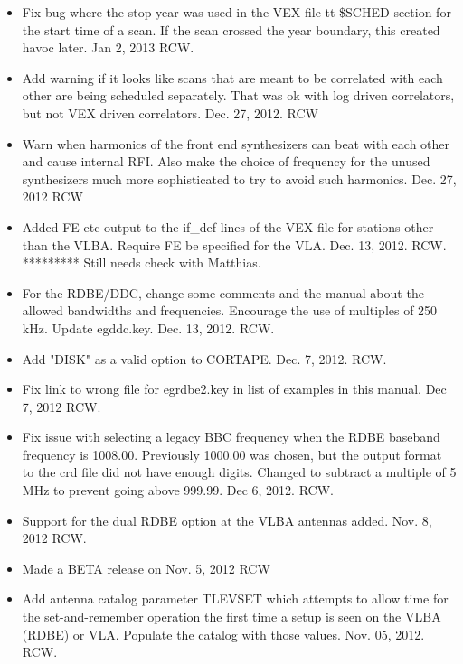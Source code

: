 \documentclass{report}
\begin{document}
\begin{itemize}
\item Fix bug where the stop year was used in the VEX file {tt
\$SCHED} section for the start time of a scan.  If the scan crossed
the year boundary, this created havoc later.  Jan 2, 2013 RCW.

\item Add warning if it looks like scans that are meant to be correlated
with each other are being scheduled separately.  That was ok with log
driven correlators, but not VEX driven correlators.  Dec. 27, 2012. RCW

\item Warn when harmonics of the front end synthesizers can beat with
each other and cause internal RFI.  Also make the choice of frequency
for the unused synthesizers much more sophisticated to try to avoid
such harmonics.  Dec. 27, 2012  RCW

\item Added FE etc output to the if\_def lines of the VEX file for
stations other than the VLBA.  Require FE be specified for the VLA.
Dec. 13, 2012.  RCW.  *********  Still needs check with Matthias.



\item For the RDBE/DDC, change some comments and the manual about the
allowed bandwidths and frequencies.  Encourage the use of multiples
of 250 kHz.  Update egddc.key.  Dec. 13, 2012.  RCW.

\item Add "DISK" as a valid option to CORTAPE.  Dec. 7, 2012.  RCW.

\item Fix link to wrong file for egrdbe2.key in list of examples in
this manual.  Dec 7, 2012  RCW.

\item Fix issue with selecting a legacy BBC frequency when the RDBE
baseband frequency is 1008.00.  Previously 1000.00 was chosen, but
the output format to the crd file did not have enough digits.  Changed
to subtract a multiple of 5 MHz to prevent going above 999.99.
Dec 6, 2012. RCW.

\item Support for the dual RDBE option at the VLBA antennas added.
Nov. 8, 2012  RCW.

\item Made a BETA release on Nov. 5, 2012  RCW

\item Add antenna catalog parameter TLEVSET which attempts to allow
time for the set-and-remember operation the first time a setup is seen
on the VLBA (RDBE) or VLA.  Populate the catalog with those values.
Nov. 05, 2012.  RCW.


\end{itemize}
\end{document}
